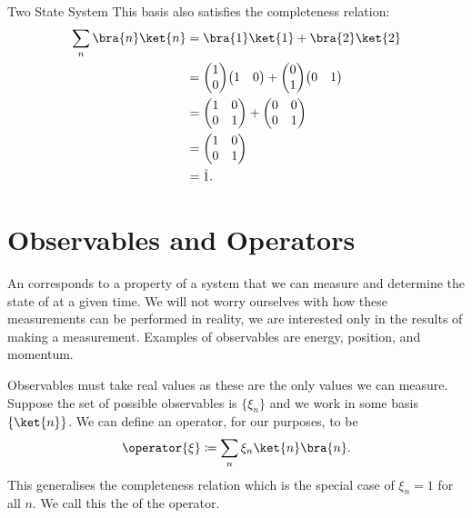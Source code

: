 \documentclass[fleqn]{NotesClass}
\newcommand*{\idop}{\hat{1}}
\renewenvironment*{vector}{\begin{pmatrix}}{\end{pmatrix}}
\newenvironment*{mat}{\begin{pmatrix}}{\end{pmatrix}}
\begin{document}
\begin{exm}{Two State System}{}
        This basis also satisfies the completeness relation:
        \begin{align}
            \sum_n \bra{n}\ket{n} &= \bra{1}\ket{1} + \bra{2}\ket{2}\\
            &= 
            \begin{vector}
                1\\ 0
            \end{vector}
            \begin{vector}
                1 & 0
            \end{vector}
            +
            \begin{vector}
                0\\ 1
            \end{vector}
            \begin{vector}
                0 & 1
            \end{vector}
            \\
            &= 
            \begin{mat}
                1 & 0\\
                0 & 1
            \end{mat}
            +
            \begin{mat}
                0 & 0\\
                0 & 1
            \end{mat}
            \\
            &=
            \begin{mat}
                1 & 0\\
                0 & 1
            \end{mat}
            \\
            &= \idop.
        \end{align}
    \end{exm}

    \section{Observables and Operators}
    An  corresponds to a property of a system that we can measure and determine the state of at a given time.
    We will not worry ourselves with how these measurements can be performed in reality, we are interested only in the results of making a measurement.
    Examples of observables are energy, position, and momentum.
    
    Observables must take real values as these are the only values we can measure.
    Suppose the set of possible observables is \(\{\xi_n\}\) and we work in some basis \(\{\ket{n}\}\).
    We can define an operator, for our purposes, to be
    \begin{equation}
        \operator{\xi} \coloneqq \sum_n \xi_n \ket{n}\bra{n}.
    \end{equation}
    This generalises the completeness relation which is the special case of \(\xi_n = 1\) for all \(n\).
    We call this the  of the operator.
    
\end{document}
